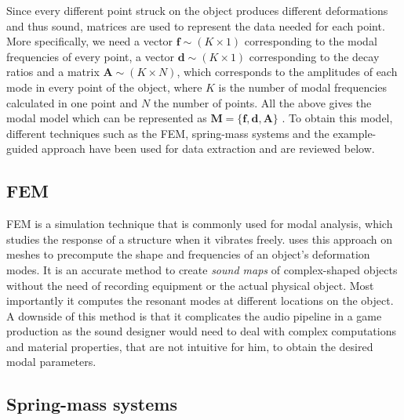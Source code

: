 Since every different point struck on the object produces different deformations and thus sound, matrices are used to represent the data needed for each point. More specifically, we need a vector $\textbf{f}\sim (K \times 1)$  corresponding to the modal frequencies of every point, a vector $\textbf{d}\sim (K \times 1)$ corresponding to the decay ratios and a matrix $\textbf{A}\sim (K \times N)$, which corresponds to the amplitudes of each mode in every point of the object, where $K$ is the number of modal frequencies calculated in one point and $N$ the number of points. All the above gives the modal model which can be represented as $\textbf{M} = \{\textbf{f}, \textbf{d}, \textbf{A}\}$ \cite{van2001foleyautomatic}. To obtain this model, different techniques such as the \gls{FEM}, spring-mass systems and the example-guided approach have been used for data extraction and are reviewed below.


\subsection{FEM}\label{sec:fem}

\gls{FEM} is a simulation technique that is commonly used for modal analysis, which studies the response of a structure when it vibrates freely. \cite{o2002synthesizing} uses this approach on meshes to precompute the shape and frequencies of an object's deformation modes. It is an accurate method to create \textit{sound maps} of complex-shaped objects without the need of recording equipment or the actual physical object. Most importantly it computes the resonant modes at different locations on the object. A downside of this method is that it complicates the audio pipeline in a game production as the sound designer would need to deal with complex computations and material properties, that are not intuitive for him, to obtain the desired modal parameters.

\subsection{Spring-mass systems}\label{sec:springmass}

